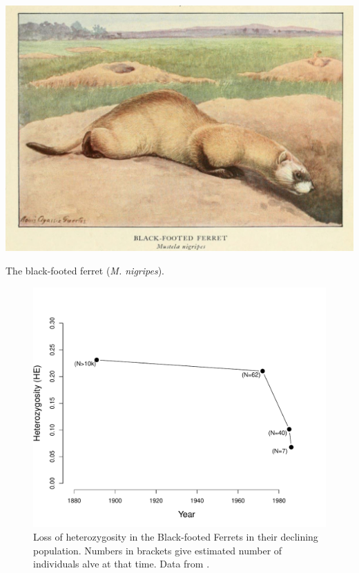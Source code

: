 \begin{marginfigure}[6cm]
\begin{center}
\includegraphics[width=\textwidth]{illustration_images/Genetic_drift/Black_footed_ferrets/Black_footed_ferret.pdf}
\end{center}
\caption{The black-footed ferret ({\it M. nigripes}). } \label{fig:black_footed_ferret}  
\end{marginfigure} 

\begin{figure}
\begin{center}
\includegraphics[width= \textwidth]{Journal_figs/genetic_drift/black_footed_ferrets/black_footed_ferrets_He.pdf}
\end{center}
\caption{Loss of heterozygosity in the Black-footed Ferrets in their declining population. Numbers in brackets give estimated number of individuals alve at that time. Data from \citet{Wisely:02}. } \label{fig:LossHet_ferrets}  
\end{figure} 

